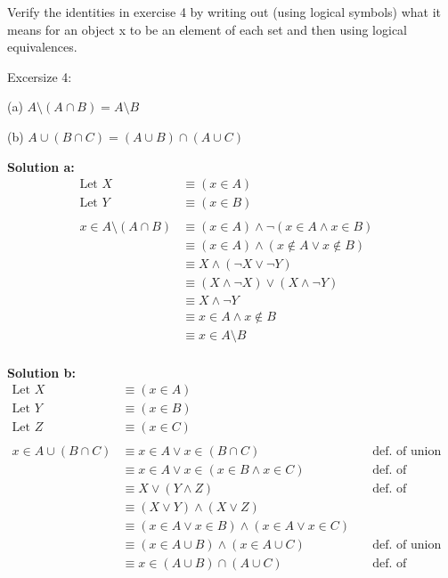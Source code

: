 \begin{tcolorbox}[title=Problem 5, breakable]
Verify the identities in exercise 4 by writing out (using
logical symbols) what it means for an object x to be an element
of each set and then using logical equivalences.

Excersize 4: 

(a) $A \setminus (A \cap B) = A \setminus B$ 

(b) $A \cup (B \cap C) = (A \cup B) \cap (A \cup C)$
\end{tcolorbox}

\textbf{Solution a:}
\begin{align*}
\text{Let } X &\equiv (x \in A) \\
\text{Let } Y &\equiv (x \in B) \\ \\
x \in A \setminus (A \cap B) &\equiv (x \in A) \wedge \neg(x \in A \wedge x \in B) & \\
&\equiv (x \in A) \wedge (x \not \in A \vee x \not \in B) & \\
&\equiv X \wedge (\neg X \vee \neg Y) & \\
&\equiv (X \wedge \neg X) \vee (X \wedge \neg Y) & \\
&\equiv X \wedge \neg Y & \\
&\equiv x \in A \wedge x \not \in B & \\
&\equiv x \in A \setminus B & \\
\end{align*}

\textbf{Solution b:}
\begin{align*}
\text{Let } X &\equiv (x \in A) \\
\text{Let } Y &\equiv (x \in B) \\
\text{Let } Z &\equiv (x \in C) \\ \\
x \in A \cup (B \cap C) &\equiv x \in A \vee x \in (B \cap C) &\quad \text{def. of union} & \\
&\equiv x \in A \vee x \in (x \in B \wedge x \in C) &\quad \text{def. of intersection} & \\
&\equiv X \vee (Y \wedge Z) &\quad \text{def. of intersection} & \\
&\equiv (X \vee Y) \wedge (X \vee Z) &\quad \text{} & \\
&\equiv (x \in A \vee x \in B) \wedge (x \in A \vee x \in C) &\quad \text{} & \\
&\equiv (x \in A \cup B) \wedge (x \in A \cup C) &\quad \text{def. of union} & \\
&\equiv x \in (A \cup B) \cap (A \cup C) &\quad \text{def. of intersection} & \\
\end{align*}

